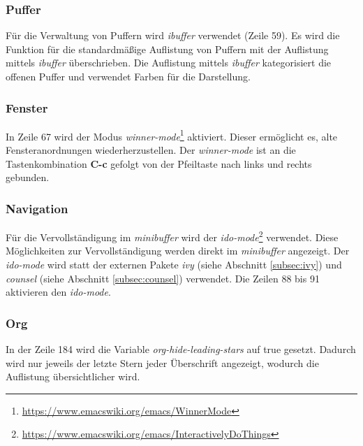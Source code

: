 \subsubsection{Puffer}
Für die Verwaltung von Puffern wird \textit{ibuffer} verwendet (Zeile
59). Es wird die Funktion für die standardmäßige Auflistung von
Puffern mit der Auflistung mittels \textit{ibuffer} überschrieben. Die
Auflistung mittels \textit{ibuffer} kategorisiert die offenen Puffer
und verwendet Farben für die Darstellung.\\

\subsubsection{Fenster}
In Zeile 67 wird der Modus
\textit{winner-mode}\footnote{\url{https://www.emacswiki.org/emacs/WinnerMode}}
aktiviert. Dieser ermöglicht es, alte Fensteranordnungen
wiederherzustellen. Der \textit{winner-mode} ist an die
Tastenkombination \textbf{C-c} gefolgt von der Pfeiltaste nach links
und rechts gebunden.\\

\subsubsection{Navigation}
Für die Vervollständigung im \textit{minibuffer} wird der
\textit{ido-mode}\footnote{\url{https://www.emacswiki.org/emacs/InteractivelyDoThings}}
verwendet. Diese Möglichkeiten zur Vervollständigung werden direkt im
\textit{minibuffer} angezeigt. Der \textit{ido-mode} wird statt der
externen Pakete \textit{ivy} (siehe Abschnitt \ref{subsec:ivy}) und
\textit{counsel} (siehe Abschnitt \ref{subsec:counsel}) verwendet. Die
Zeilen 88 bis 91 aktivieren den \textit{ido-mode}.\\

\subsubsection{Org}
In der Zeile 184 wird die Variable \textit{org-hide-leading-stars} auf
{\glqq}true{\grqq} gesetzt. Dadurch wird nur jeweils der letzte Stern
jeder Überschrift angezeigt, wodurch die Auflistung übersichtlicher
wird.\\

